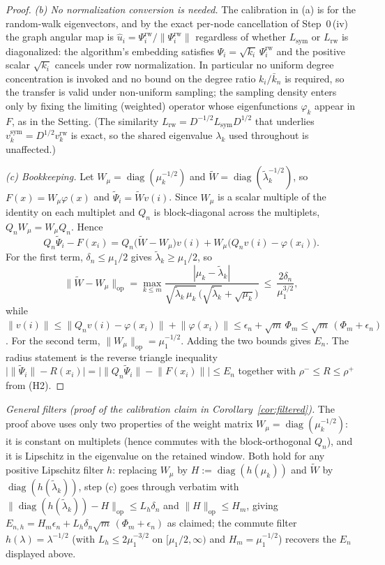 \documentclass[review,supplement]{siamart220329}
\begin{document}
\begin{proof}
\emph{(b) No normalization conversion is needed.} The calibration in (a) is for
the random-walk eigenvectors, and by the exact per-node cancellation of
Step~0\,(iv) the graph angular map is
$\hat u_i=\Psi^{\mathrm{rw}}_i/\lVert\Psi^{\mathrm{rw}}_i\rVert$ regardless of
whether $L_{\mathrm{sym}}$ or $L_{\mathrm{rw}}$ is diagonalized: the algorithm's
embedding satisfies $\Psi_i=\sqrt{k_i}\,\Psi^{\mathrm{rw}}_i$ and the positive
scalar $\sqrt{k_i}$ cancels under row normalization. In particular no uniform
degree concentration is invoked and no bound on the degree ratio $k_i/\bar k_n$
is required, so the transfer is valid under non-uniform sampling; the sampling
density enters only by fixing the limiting (weighted) operator whose
eigenfunctions $\varphi_k$ appear in $F$, as in the Setting. (The similarity
$L_{\mathrm{rw}}=D^{-1/2}L_{\mathrm{sym}}D^{1/2}$ that underlies
$v^{\mathrm{sym}}_k=D^{1/2}v^{\mathrm{rw}}_k$ is exact, so the shared eigenvalue
$\lambda_k$ used throughout is unaffected.)

\emph{(c) Bookkeeping.} Let $W_\mu=\operatorname{diag}(\mu_k^{-1/2})$ and
$\widetilde W=\operatorname{diag}(\tilde\lambda_k^{-1/2})$, so
$F(x)=W_\mu\varphi(x)$ and $\widetilde\Psi_i=\widetilde W v(i)$. Since $W_\mu$
is a scalar multiple of the identity on each multiplet and $Q_n$ is
block-diagonal across the multiplets, $Q_nW_\mu=W_\mu Q_n$. Hence
\[
Q_n\widetilde\Psi_i-F(x_i)
=Q_n\big(\widetilde W-W_\mu\big)v(i)
+W_\mu\big(Q_nv(i)-\varphi(x_i)\big).
\]
For the first term, $\delta_n\le\mu_1/2$ gives $\tilde\lambda_k\ge\mu_1/2$, so
\[
\big\lVert\widetilde W-W_\mu\big\rVert_{\mathrm{op}}
=\max_{k\le m}\frac{|\mu_k-\tilde\lambda_k|}
{\sqrt{\tilde\lambda_k\,\mu_k}\,\big(\sqrt{\tilde\lambda_k}+\sqrt{\mu_k}\big)}
\ \le\ \frac{2\delta_n}{\mu_1^{3/2}},
\]
while $\lVert v(i)\rVert\le\lVert Q_nv(i)-\varphi(x_i)\rVert
+\lVert\varphi(x_i)\rVert\le\epsilon_n+\sqrt m\,\Phi_m
\le\sqrt m\,(\Phi_m+\epsilon_n)$. For the second term,
$\lVert W_\mu\rVert_{\mathrm{op}}=\mu_1^{-1/2}$. Adding the two bounds gives
$E_n$. The radius statement is the reverse triangle inequality
$\big|\lVert\widetilde\Psi_i\rVert-R(x_i)\big|
=\big|\lVert Q_n\widetilde\Psi_i\rVert-\lVert F(x_i)\rVert\big|\le E_n$
together with $\rho^-\le R\le\rho^+$ from (H2).
\end{proof}

\emph{General filters (proof of the calibration claim in
Corollary~\ref{cor:filtered}).} The proof above uses only two properties of
the weight matrix $W_\mu=\operatorname{diag}(\mu_k^{-1/2})$: it is constant on
multiplets (hence commutes with the block-orthogonal $Q_n$), and it is
Lipschitz in the eigenvalue on the retained window. Both hold for any positive
Lipschitz filter $h$: replacing $W_\mu$ by
$H:=\operatorname{diag}(h(\mu_k))$ and $\widetilde W$ by
$\operatorname{diag}(h(\tilde\lambda_k))$, step (c) goes through verbatim with
$\lVert\operatorname{diag}(h(\tilde\lambda_k))-H\rVert_{\mathrm{op}}
\le L_h\delta_n$ and $\lVert H\rVert_{\mathrm{op}}\le H_m$, giving
$E_{n,h}=H_m\epsilon_n+L_h\delta_n\sqrt m\,(\Phi_m+\epsilon_n)$ as claimed;
the commute filter $h(\lambda)=\lambda^{-1/2}$ (with $L_h\le2\mu_1^{-3/2}$ on
$[\mu_1/2,\infty)$ and $H_m=\mu_1^{-1/2}$) recovers the $E_n$ displayed above.
\end{document}
